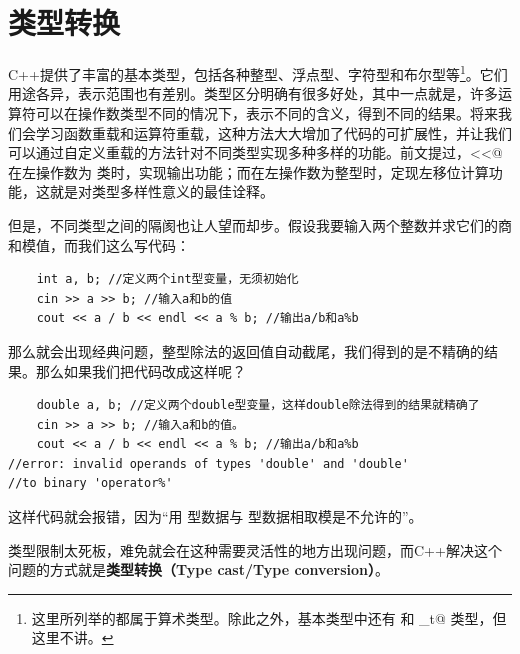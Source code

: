 \section{类型转换}
C++提供了丰富的基本类型，包括各种整型、浮点型、字符型和布尔型等\footnote{这里所列举的都属于算术类型。除此之外，基本类型中还有 \lstinline@void@ 和 \lstinline@nullptr_t@ 类型，但这里不讲。}。它们用途各异，表示范围也有差别。类型区分明确有很多好处，其中一点就是，许多运算符可以在操作数类型不同的情况下，表示不同的含义，得到不同的结果。将来我们会学习函数重载和运算符重载，这种方法大大增加了代码的可扩展性，并让我们可以通过自定义重载的方法针对不同类型实现多种多样的功能。前文提过，\lstinline@<<@ 在左操作数为 \lstinline@ostream@ 类时，实现输出功能；而在左操作数为整型时，定现左移位计算功能，这就是对类型多样性意义的最佳诠释。\par
但是，不同类型之间的隔阂也让人望而却步。假设我要输入两个整数并求它们的商和模值，而我们这么写代码：
\begin{lstlisting}
    int a, b; //定义两个int型变量，无须初始化
    cin >> a >> b; //输入a和b的值
    cout << a / b << endl << a % b; //输出a/b和a%b
\end{lstlisting}
那么就会出现经典问题，整型除法的返回值自动截尾，我们得到的是不精确的结果。那么如果我们把代码改成这样呢？
\begin{lstlisting}
    double a, b; //定义两个double型变量，这样double除法得到的结果就精确了
    cin >> a >> b; //输入a和b的值。
    cout << a / b << endl << a % b; //输出a/b和a%b
//error: invalid operands of types 'double' and 'double'
//to binary 'operator%'
\end{lstlisting}
这样代码就会报错，因为``用 \lstinline@double@ 型数据与 \lstinline@double@ 型数据相取模是不允许的''。\par
类型限制太死板，难免就会在这种需要灵活性的地方出现问题，而C++解决这个问题的方式就是\textbf{类型转换（Type cast/Type conversion）}。\par
